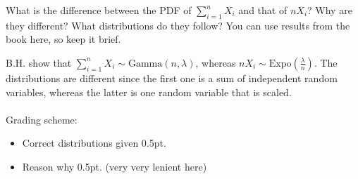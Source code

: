 \begin{exercise}[1]
What is the difference between the PDF of $\sum\limits_{i=1}^{n}{X_i}$ and that of $n X_i$? Why are they different? What distributions do they follow? You can use results from the book here, so keep it brief.
\begin{solution}
B.H. show that $\sum\limits_{i=1}^{n}{X_i}\sim\text{Gamma}(n, \lambda)$, whereas $n X_i\sim\text{Expo}\left(\frac{\lambda}{n}\right)$. The distributions are different since the first one is a sum of independent random variables, whereas the latter is one random variable that is scaled.
\\\\
Grading scheme:
\begin{itemize}
    \item Correct distributions given 0.5pt.
    \item Reason why 0.5pt. (very very lenient here)
\end{itemize}
\end{solution}
\end{exercise}

